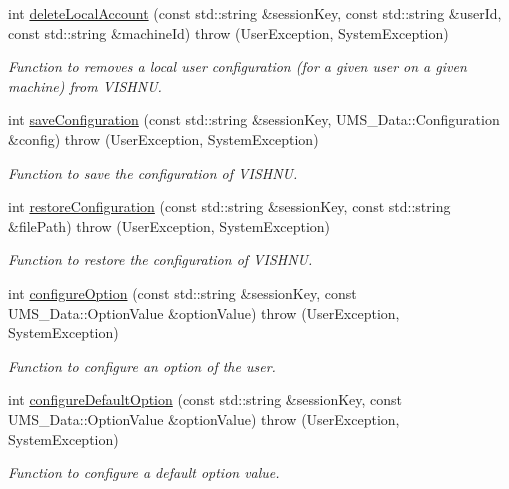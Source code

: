 \begin{DoxyCompactItemize}
int \hyperlink{namespacevishnu_a2b51028779571b21c45a2a75cd362c59}{deleteLocalAccount} (const std::string \&sessionKey, const std::string \&userId, const std::string \&machineId)  throw (UserException, SystemException)
\begin{DoxyCompactList}\small\item\em Function to removes a local user configuration (for a given user on a given machine) from VISHNU. \item\end{DoxyCompactList}\item 
int \hyperlink{namespacevishnu_a2ecc54aee4da202b1caa94dfa6a43d17}{saveConfiguration} (const std::string \&sessionKey, UMS\_\-Data::Configuration \&config)  throw (UserException, SystemException)
\begin{DoxyCompactList}\small\item\em Function to save the configuration of VISHNU. \item\end{DoxyCompactList}\item 
int \hyperlink{namespacevishnu_a60ecb3b47532d0df7b0d44fdf43f98f4}{restoreConfiguration} (const std::string \&sessionKey, const std::string \&filePath)  throw (UserException, SystemException)
\begin{DoxyCompactList}\small\item\em Function to restore the configuration of VISHNU. \item\end{DoxyCompactList}\item 
int \hyperlink{namespacevishnu_a5b88fcd36b780df012b2529fe3526ca1}{configureOption} (const std::string \&sessionKey, const UMS\_\-Data::OptionValue \&optionValue)  throw (UserException, SystemException)
\begin{DoxyCompactList}\small\item\em Function to configure an option of the user. \item\end{DoxyCompactList}\item 
int \hyperlink{namespacevishnu_a05878cbc7dbb3f5da87dbc32dd25ab78}{configureDefaultOption} (const std::string \&sessionKey, const UMS\_\-Data::OptionValue \&optionValue)  throw (UserException, SystemException)
\begin{DoxyCompactList}\small\item\em Function to configure a default option value. \item\end{DoxyCompactList}\item 

\end{DoxyCompactItemize}
